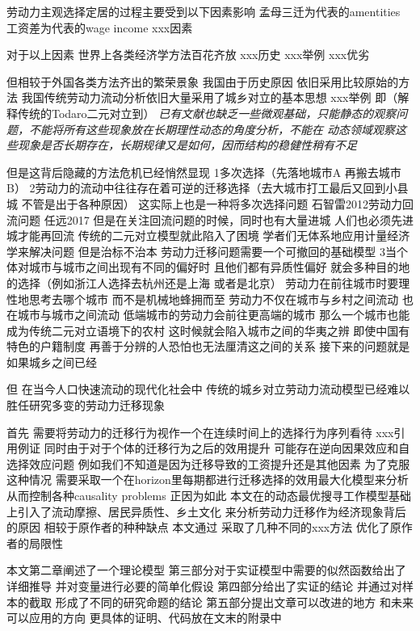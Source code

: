 \documentclass[a4paper,10pt]{article}
\begin{document}
劳动力主观选择定居的过程主要受到以下因素影响
孟母三迁为代表的amentities
工资差为代表的wage income
xxx因素

对于以上因素
世界上各类经济学方法百花齐放
xxx历史
xxx举例
xxx优劣

但相较于外国各类方法齐出的繁荣景象
我国由于历史原因
依旧采用比较原始的方法
我国传统劳动力流动分析依旧大量采用了城乡对立的基本思想
xxx举例
即（解释传统的Todaro二元对立到）
\textit{已有文献也缺乏一些微观基础，只能静态的观察问题，不能将所有这些现象放在长期理性动态的角度分析，不能在  动态领域观察这些现象是否长期存在，长期规律又是如何，因而结构的稳健性稍有不足}

但是这背后隐藏的方法危机已经悄然显现
1多次选择（先落地城市A 再搬去城市B）
2劳动力的流动中往往存在着可逆的迁移选择（去大城市打工最后又回到小县城 不管是出于各种原因） 这实际上也是一种将多次选择问题 
石智雷2012劳动力回流问题
任远2017
但是在关注回流问题的时候，同时也有大量进城
人们也必须先进城才能再回流
传统的二元对立模型就此陷入了困境 学者们无体系地应用计量经济学来解决问题 但是治标不治本
劳动力迁移问题需要一个可撤回的基础模型
3当个体对城市与城市之间出现有不同的偏好时 且他们都有异质性偏好 就会多种目的地的选择（例如浙江人选择去杭州还是上海 或者是北京）
劳动力在前往城市时要理性地思考去哪个城市 而不是机械地蜂拥而至
劳动力不仅在城市与乡村之间流动 也在城市与城市之间流动
低端城市的劳动力会前往更高端的城市 那么一个城市也能成为传统二元对立语境下的农村 这时候就会陷入城市之间的华夷之辨 即使中国有特色的户籍制度 再善于分辨的人恐怕也无法厘清这之间的关系 接下来的问题就是如果城乡之间已经

但
在当今人口快速流动的现代化社会中
传统的城乡对立劳动力流动模型已经难以胜任研究多变的劳动力迁移现象

首先
需要将劳动力的迁移行为视作一个在连续时间上的选择行为序列看待
xxx引用例证
同时由于对于个体的迁移行为之后的效用提升
可能存在逆向因果效应和自选择效应问题
例如我们不知道是因为迁移导致的工资提升还是其他因素
为了克服这种情况
需要采取一个在horizon里每期都进行迁移选择的效用最大化模型来分析
从而控制各种causality problems
正因为如此
本文在\cite{kennanEffectExpectedIncome2011}的动态最优搜寻工作模型基础上引入了流动摩擦、居民异质性、乡土文化
来分析劳动力迁移作为经济现象背后的原因
相较于原作者的种种缺点
本文通过
采取了几种不同的xxx方法
优化了原作者的局限性

本文第二章阐述了一个理论模型
第三部分对于实证模型中需要的似然函数给出了详细推导 并对变量进行必要的简单化假设
第四部分给出了实证的结论 并通过对样本的截取 形成了不同的研究命题的结论
第五部分提出文章可以改进的地方 和未来可以应用的方向
更具体的证明、代码放在文末的附录中
\end{document}

